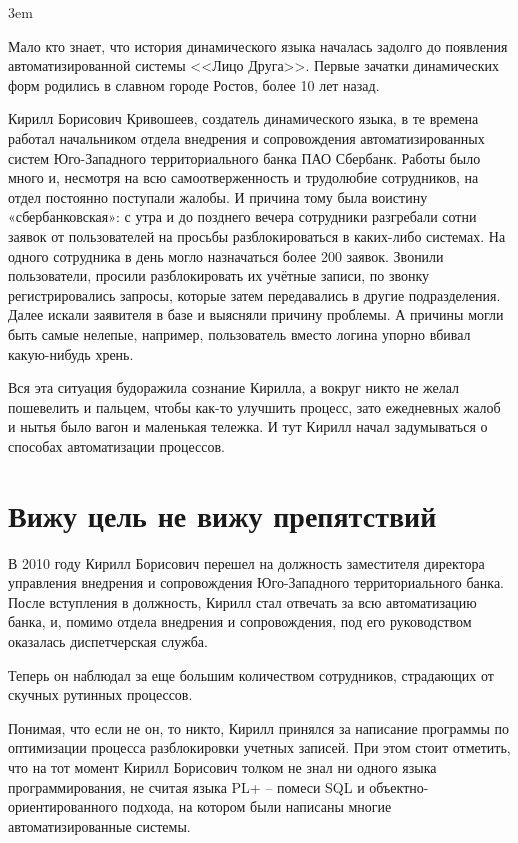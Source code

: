 \documentclass[../index.tex]{subfiles}
\begin{document}
\emergencystretch 3em

Мало кто знает, что история динамического языка началась задолго до появления автоматизированной системы <<Лицо Друга>>. Первые зачатки динамических форм родились в славном городе Ростов, более 10 лет назад.


Кирилл Борисович Кривошеев, создатель динамического языка,  в те времена работал начальником отдела внедрения и сопровождения автоматизированных систем Юго-Западного территориального банка ПАО Сбербанк. Работы было много и, несмотря на всю самоотверженность и трудолюбие сотрудников, на отдел постоянно поступали жалобы. И причина тому была воистину «сбербанковская»: с утра и до позднего вечера сотрудники разгребали сотни заявок от пользователей на просьбы разблокироваться в каких-либо системах. На одного сотрудника в день могло назначаться более 200 заявок. Звонили пользователи, просили разблокировать их учётные записи, по звонку регистрировались запросы, которые затем передавались в другие подразделения. Далее искали заявителя в базе и выясняли причину проблемы. А причины могли быть самые нелепые, например, пользователь вместо логина упорно вбивал какую-нибудь хрень.


Вся эта ситуация будоражила сознание Кирилла, а вокруг никто не желал пошевелить и пальцем, чтобы как-то улучшить процесс, зато ежедневных жалоб и нытья было вагон и маленькая тележка.
И тут Кирилл начал задумываться о способах автоматизации процессов.

\section{Вижу цель не вижу препятствий}

В 2010 году Кирилл Борисович перешел на должность заместителя директора управления внедрения и сопровождения Юго-Западного территориального банка. После вступления в должность, Кирилл стал отвечать за всю автоматизацию банка, и, помимо отдела внедрения и сопровождения, под его руководством оказалась диспетчерская служба.

Теперь он наблюдал за еще большим количеством сотрудников, страдающих от скучных рутинных процессов.

Понимая, что если не он, то никто, Кирилл принялся за написание программы по оптимизации процесса разблокировки учетных записей. При этом стоит отметить, что на тот момент Кирилл Борисович толком не знал ни одного языка программирования, не считая языка PL+ -- помеси SQL и объектно-ориентированного подхода, на котором были написаны многие автоматизированные системы.
\end{document}
